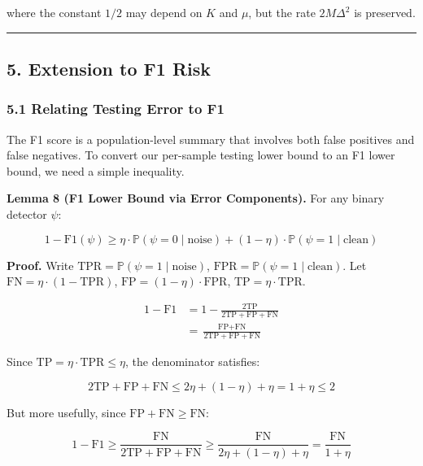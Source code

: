 \documentclass[
  12pt,
]{ctexart}
\begin{document}
where the constant \(1/2\) may depend on \(K\) and \(\mu\), but the rate
\(2M\Delta^2\) is preserved.

\begin{center}\rule{0.5\linewidth}{0.5pt}\end{center}

\subsection{5. Extension to F1 Risk}\label{extension-to-f1-risk}

\subsubsection{5.1 Relating Testing Error to
F1}\label{relating-testing-error-to-f1}

The F1 score is a population-level summary that involves both false
positives and false negatives. To convert our per-sample testing lower
bound to an F1 lower bound, we need a simple inequality.

\textbf{Lemma 8 (F1 Lower Bound via Error Components).} For any binary
detector \(\psi\):

\[1 - \text{F1}(\psi) \geq \eta \cdot \mathbb{P}(\psi=0 \mid \text{noise}) + (1-\eta) \cdot \mathbb{P}(\psi=1 \mid \text{clean})\]

\textbf{Proof.} Write
\(\text{TPR} = \mathbb{P}(\psi=1 \mid \text{noise})\),
\(\text{FPR} = \mathbb{P}(\psi=1 \mid \text{clean})\). Let
\(\text{FN} = \eta \cdot (1 - \text{TPR})\),
\(\text{FP} = (1-\eta) \cdot \text{FPR}\),
\(\text{TP} = \eta \cdot \text{TPR}\).

\[\begin{aligned}
1 - \text{F1} &= 1 - \frac{2\text{TP}}{2\text{TP} + \text{FP} + \text{FN}} \\
&= \frac{\text{FP} + \text{FN}}{2\text{TP} + \text{FP} + \text{FN}}
\end{aligned}\]

Since \(\text{TP} = \eta\cdot\text{TPR} \leq \eta\), the denominator
satisfies:

\[2\text{TP} + \text{FP} + \text{FN} \leq 2\eta + (1-\eta) + \eta = 1 + \eta \leq 2\]

But more usefully, since \(\text{FP} + \text{FN} \geq \text{FN}\):

\[1 - \text{F1} \geq \frac{\text{FN}}{2\text{TP} + \text{FP} + \text{FN}} \geq \frac{\text{FN}}{2\eta + (1-\eta) + \eta} = \frac{\text{FN}}{1+\eta}\]
\end{document}
